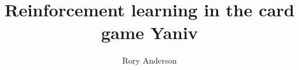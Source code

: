 \documentclass{UoYCSproject}
\author{Rory Anderson}
\title{Reinforcement learning in the card game Yaniv}
\begin{document}

\maketitle
\listoffigures
\listoftables

\begin{summary}
\end{summary}









\printbibliography
\end{document}
